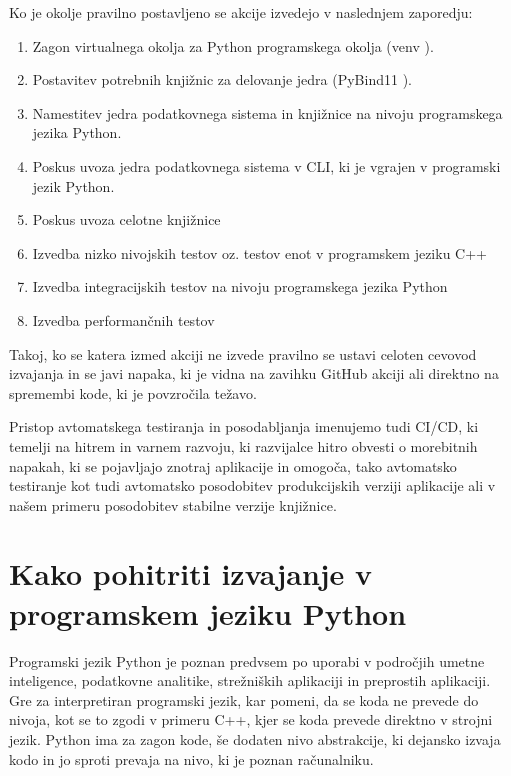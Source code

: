 \documentclass[a4paper,12pt,openright]{book}
\begin{document}
   Ko je okolje pravilno postavljeno se akcije izvedejo v naslednjem zaporedju:
   \begin{enumerate}
       \item Zagon virtualnega okolja za Python programskega okolja (venv \cite{PY_VENV_DOCS}).
       \item Postavitev potrebnih knjižnic za delovanje jedra (PyBind11 \cite{PYBIND11_GITHUB}).
       \item Namestitev jedra podatkovnega sistema in knjižnice na nivoju programskega jezika Python.
       \item Poskus uvoza jedra podatkovnega sistema v CLI, ki je vgrajen v programski jezik Python.
       \item Poskus uvoza celotne knjižnice
       \item Izvedba nizko nivojskih testov oz. testov enot v programskem jeziku C++
       \item Izvedba integracijskih testov na nivoju programskega jezika Python
       \item Izvedba performančnih testov
   \end{enumerate}

    \noindent
   Takoj, ko se katera izmed akciji ne izvede pravilno se ustavi celoten cevovod izvajanja in se javi napaka, ki je vidna na zavihku GitHub akciji ali direktno na spremembi kode, ki je povzročila težavo.

   Pristop avtomatskega testiranja in posodabljanja imenujemo tudi CI/CD, ki temelji na hitrem in varnem razvoju, ki razvijalce hitro obvesti o morebitnih napakah, ki se pojavljajo znotraj aplikacije in omogoča, tako avtomatsko testiranje kot tudi avtomatsko posodobitev produkcijskih verziji aplikacije ali v našem primeru posodobitev stabilne verzije knjižnice.
   
    \section{Kako pohitriti izvajanje v programskem jeziku Python}
   Programski jezik Python je poznan predvsem po uporabi v področjih umetne inteligence, podatkovne analitike, strežniških aplikaciji in preprostih aplikaciji. Gre za interpretiran programski jezik, kar pomeni, da se koda ne prevede do nivoja, kot se to zgodi v primeru C++, kjer se koda prevede direktno v strojni jezik. Python ima za zagon kode, še dodaten nivo abstrakcije, ki dejansko izvaja kodo in jo sproti prevaja na nivo, ki je poznan računalniku.
\end{document}

